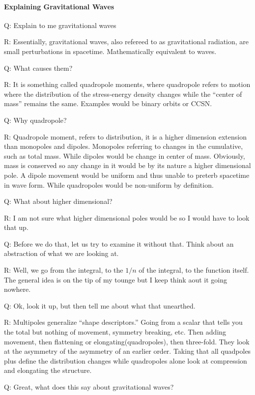 \paragraph{Explaining Gravitational Waves}
Q: Explain to me gravitational waves

R: Essentially, gravitational waves, also refereed to as gravitational radiation, are small perturbations in spacetime. Mathematically equivalent to waves.

Q: What causes them?

R: It is something called quadropole moments, where quadropole refers to motion where the distribution of the stress-energy density changes while the ``center of mass'' remains the same. Examples would be binary orbits or CCSN.

Q: Why quadropole?

R: Quadropole moment, refers to distribution, it is a higher dimension extension than monopoles and dipoles. Monopoles referring to changes in the cumulative, such as total mass. While dipoles would be change in center of mass. Obviously, mass is conserved so any change in it would be by its nature a higher dimensional pole. A dipole movement would be uniform and thus unable to preterb spacetime in wave form. While quadropoles would be non-uniform by definition.

Q: What about higher dimensional?

R: I am not sure what higher dimensional poles would be so I would have to look that up.

Q: Before we do that, let us try to examine it without that. Think about an abstraction of what we are looking at.

R: Well, we go from the integral, to the $1/n$ of the integral, to the function itself. The general idea is on the tip of my tounge but I keep think aout it going nowhere.

Q: Ok, look it up, but then tell me about what that unearthed.

R: Multipoles generalize ``shape descriptors.'' Going from a scalar that tells you the total but nothing of movement, symmetry breaking, etc. Then adding movement, then flattening or elongating(quadropoles), then three-fold. They look at the asymmetry of the asymmetry of an earlier order. Taking that all quadpoles plus define the distribution changes while quadropoles alone look at compression and elongating the structure.

Q: Great, what does this say about gravitational waves?


